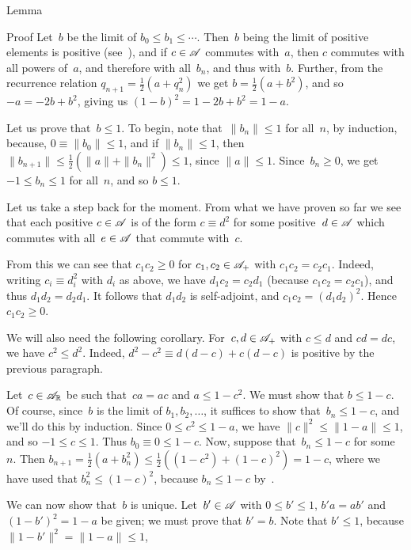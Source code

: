 \documentclass[a]{subfiles}
\begin{document}
\begin{parsec}
\begin{point}{Lemma}
\begin{point}{Proof}
Let~$b$ be the limit of $b_0\leq b_1\leq\dotsb$.
Then~$b$ being the limit of positive elements
is positive
(see~),
and if $c\in \mathscr{A}$ commutes with~$a$,
then $c$ commutes with all powers of~$a$,
and therefore with all~$b_n$,
and thus with~$b$.
Further, 
from the recurrence relation $q_{n+1} = \frac{1}{2}(a+q_n^2)$
we get $b=\frac{1}{2}(a+b^2)$,
and so $-a = -2b+b^2$, 
giving us  $(1-b)^2 = 1-2b+b^2 = 1-a$.

Let us prove that~$b\leq 1$.
To begin, note that~$\|b_n\|\leq 1$ for all~$n$, by induction,
because, $0\equiv \|b_0\|\leq 1$,
and if $\|b_n\|\leq 1$, then $\|b_{n+1}\|\leq \frac{1}{2}(\|a\|+\|b_n\|^2)
\leq 1$, since $\|a\|\leq 1$.
Since~$b_n\geq 0$, we get $-1\leq b_n\leq 1$ for all~$n$,
and so $b\leq 1$.

\begin{point}%
Let us take a step back for the moment.
From what we have proven so far
we see that each positive $c\in\mathscr{A}$
is of the form $c\equiv d^2$ for some positive~$d\in\mathscr{A}$
which commutes with all~$e\in \mathscr{A}$ that commute with~$c$.

From this we can see that $c_1c_2\geq 0$
for  
 $c_1,c_2 \in\mathscr{A}_{+}$
with $c_1c_2 = c_2c_1$.
Indeed, writing $c_i\equiv d_i^2$ with $d_i$ as above,
we have $d_1c_2=c_2d_1$ (because $c_1c_2=c_2c_1$), and thus 
$d_1d_2=d_2d_1$. It follows that $d_1d_2$ is self-adjoint,
and $c_1c_2 = (d_1d_2)^2$. Hence $c_1c_2\geq 0$.

We will also need the following corollary.
For~$c,d\in\mathscr{A}_{+}$ with $c\leq d$ and $cd=dc$,
we have $c^2\leq d^2$.
Indeed, $d^2-c^2 \equiv d(d-c)+c(d-c)$
is positive by the previous paragraph.
\end{point}
\begin{point}%
Let~$c\in\mathscr{A}_{\mathbb{R}}$ be such that~$ca=ac$ and  $a\leq 1-c^2$.
We must show that $b\leq 1-c$.
Of course,
since~$b$ is the limit of $b_1,b_2,\dotsc$,
it suffices to show that~$b_n\leq 1-c$,
and we'll do this by induction.
Since $0\leq c^2 \leq 1-a$,
 we have $\|c\|^2\leq \|1-a\|\leq 1$,
and so $-1\leq c\leq 1$.
Thus $b_0\equiv 0\leq 1-c$.
Now, suppose that~$b_n\leq 1-c$ for some~$n$.
Then $b_{n+1} = \frac{1}{2}(a+b_n^2)
\leq \frac{1}{2}( (1-c^2)+(1-c)^2) = 1-c$,
where we have used that $b_n^2 \leq (1-c)^2$,
because $b_n\leq 1-c$
by~.
\begin{point}%
We can now show that~$b$ is unique.
Let~$b'\in \mathscr{A}$ with $0\leq b'\leq 1$,
 $b'a=ab'$ and $(1-b')^2=1-a$ be given;
we must prove that $b'=b$.
Note that $b'\leq 1$,
because $\|1-b'\|^2=\|1-a\|\leq 1$,


\end{point}
\end{point}
\end{point}
\end{point}
\end{parsec}
\end{document}
